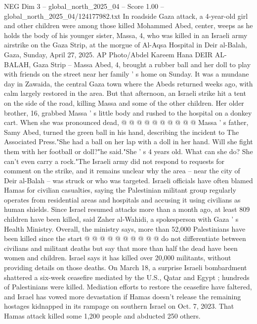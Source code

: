 \begin{textsample}{NEG Dim 3 – global\_north\_2025\_04 – Score 1.00 – global\_north\_2025\_04/124177982.txt}  \label{ex:f3_neg_409}
In roadside Gaza attack, a 4-year-old girl and other children were among those killed Mohammed Abed, center, weeps as he holds the body of his younger sister, Massa, 4, who was killed in an Israeli army airstrike on the Gaza Strip, at the morgue of Al-Aqsa Hospital in Deir al-Balah, Gaza, Sunday, April 27, 2025.
AP Photo/Abdel Kareem Hana DEIR AL-BALAH, Gaza Strip -- Massa Abed, 4, brought a rubber ball and her doll to play with friends on the street near her family ' s home on Sunday.
It was a mundane day in Zawaida, the central Gaza town where the Abeds returned weeks ago, with calm largely restored in the area.
But that afternoon, an Israeli strike hit a tent on the side of the road, killing Massa and some of the other children.
Her older brother, 16, grabbed Massa ' s little body and rushed to the hospital on a donkey cart.
When she was pronounced dead, @ @ @ @ @ @ @ @ @ @ Massa ' s father, Samy Abed, turned the green ball in his hand, describing the incident to The Associated Press."She had a ball on her lap with a doll in her hand.
Will she fight them with her football or doll?"he said."She ' s 4 years old.
What can she do?
She can't even carry a rock."The Israeli army did not respond to requests for comment on the strike, and it remains unclear why the area -- near the city of Deir al-Balah -- was struck or who was targeted.
Israeli officials have often blamed Hamas for civilian casualties, saying the Palestinian militant group regularly operates from residential areas and hospitals and accusing it using civilians as human shields.
Since Israel resumed attacks more than a month ago, at least 809 children have been killed, said Zaher al-Wahidi, a spokesperson with Gaza ' s Health Ministry.
Overall, the ministry says, more than 52,000 Palestinians have been killed since the start @ @ @ @ @ @ @ @ @ @ do not differentiate between civilians and militant deaths but say that more than half the dead have been women and children.
Israel says it has killed over 20,000 militants, without providing details on those deaths.
On March 18, a surprise Israeli bombardment shattered a six-week ceasefire mediated by the U.S., Qatar and Egypt ; hundreds of Palestinians were killed.
Mediation efforts to restore the ceasefire have faltered, and Israel has vowed more devastation if Hamas doesn't release the remaining hostages kidnapped in its rampage on southern Israel on Oct. 7, 2023.
That Hamas attack killed some 1,200 people and abducted 250 others.

\end{textsample}
